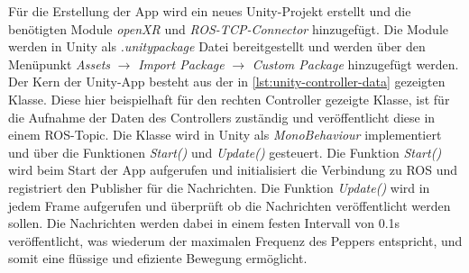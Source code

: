 Für die Erstellung der App wird ein neues Unity-Projekt erstellt und die benötigten Module \textit{openXR} und \textit{ROS-TCP-Connector} hinzugefügt. Die Module werden in Unity als \textit{.unitypackage} Datei bereitgestellt und werden über den Menüpunkt \textit{Assets} $\rightarrow$ \textit{Import Package} $\rightarrow$ \textit{Custom Package} hinzugefügt werden.\\
Der Kern der Unity-App besteht aus der in \autoref{lst:unity-controller-data} gezeigten Klasse. Diese hier beispielhaft für den rechten Controller gezeigte Klasse, ist für die Aufnahme der Daten des Controllers zuständig und veröffentlicht diese in einem \ac{ROS}-Topic. Die Klasse wird in Unity als \textit{MonoBehaviour} implementiert und über die Funktionen \textit{Start()} und \textit{Update()} gesteuert. Die Funktion \textit{Start()} wird beim Start der App aufgerufen und initialisiert die Verbindung zu \ac{ROS} und registriert den Publisher für die Nachrichten. Die Funktion \textit{Update()} wird in jedem Frame aufgerufen und überprüft ob die Nachrichten veröffentlicht werden sollen. Die Nachrichten werden dabei in einem festen Intervall von 0.1s veröffentlicht, was wiederum der maximalen Frequenz des Peppers entspricht, und somit eine flüssige und efiziente Bewegung ermöglicht.\\
